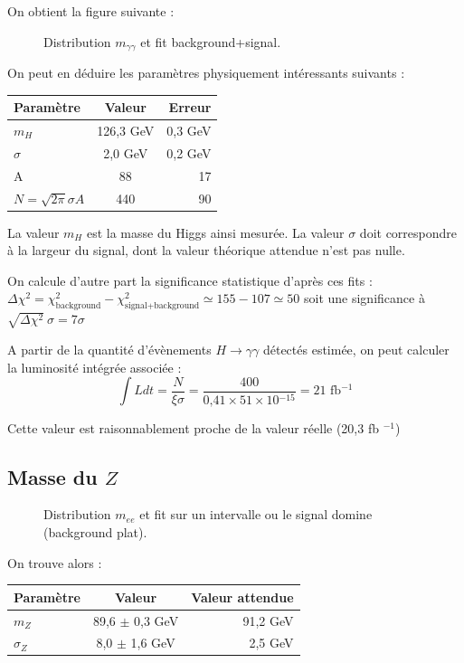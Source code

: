 \documentclass[11pt]{article} %
\begin{document}
On obtient la figure suivante :

\begin{figure}[H]
\centering
  \caption{Distribution $m_{\gamma \gamma}$ et fit background+signal. }
 \resizebox{.9\linewidth}{!}{}
\end{figure}

On peut en déduire les paramètres physiquement intéressants suivants :

\begin{tabular}{|l|c|r|} 
   \hline
   Paramètre & Valeur & Erreur \\
    \hline
   $m_H$ & 126,3 GeV & 0,3 GeV\\
  \hline
   $\sigma$ & 2,0 GeV & 0,2 GeV \\
  \hline
A & 88 & 17\\
 \hline
$N = \sqrt{2\pi} \sigma A$ & 440 & 90\\
\hline
\end{tabular}

La valeur $m_H$ est la masse du Higgs ainsi mesurée. La valeur $\sigma$ doit correspondre à la largeur du signal, dont la valeur théorique attendue n'est pas nulle.

On calcule d'autre part la significance statistique d'après ces fits : $\Delta \chi^2 = \chi^2_{\textrm{background}} - \chi^2_{\textrm{signal+background}} \simeq 155-107 \simeq 50$ soit une significance à $\sqrt{\Delta \chi^2} \ \sigma = 7 \sigma$

A partir de la quantité d'évènements $H \to \gamma \gamma$ détectés estimée, on peut calculer la luminosité intégrée associée :
\begin{equation}
\int L dt = \dfrac{N}{\xi \sigma} = \dfrac{\mbox{400}}{\mbox{0,41} \times \mbox{51} \times \mbox{10} {}^{-15}} = \mbox{21 fb} {}^{-1}
\end{equation}

Cette valeur est raisonnablement proche de la valeur réelle (20,3 fb ${}^{-1}$)

\subsection{Masse du $Z$}

\begin{figure}[H]
\centering
  \caption{Distribution $m_{ee}$ et fit sur un intervalle ou le signal domine (background plat).  }
 \resizebox{.9\linewidth}{!}{}
\end{figure}


On trouve alors :

\begin{tabular}{|l|c|r|} 
   \hline
   Paramètre & Valeur & Valeur attendue \\
    \hline
   $m_Z$ & 89,6 $\pm$ 0,3 GeV & 91,2 GeV\\
  \hline
   $\sigma_Z$ & 8,0 $\pm$ 1,6 GeV & 2,5 GeV \\
 \hline
\end{tabular}




\end{document}
